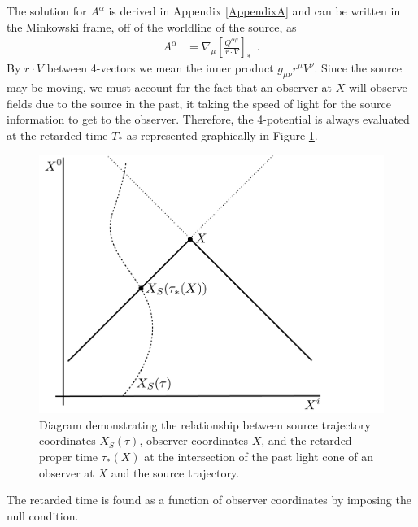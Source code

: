 The solution for $A^{\alpha}$ is derived in Appendix \ref{AppendixA} and can be written in the Minkowski frame, off of the worldline of the source, as
\begin{align}
 A^{\alpha} &=  
\nabla_{\mu}  \left[   \frac{Q^{\alpha \mu} }{
    r \cdot  V  }    \right]_{*}   \ \ .
\label{DipoleSoln1}
\end{align} 
By $r\cdot V $ between 4-vectors we mean the inner product
$g_{\mu\nu}r^\mu V^\nu$.
Since the source may be moving, we must account for the fact that an
observer at $X$ will observe fields due to the source in the past, it
taking the speed of light for the source information to get to the
observer. Therefore, 
the 4-potential is always evaluated at
the retarded time $T_*$ as represented graphically in Figure \ref{RetardedDiagram}.
\begin{figure}
\begin{center}
\includegraphics[scale=0.35]{figures/ch6/Retarded_Diagram.pdf} 
\end{center}
\caption{Diagram demonstrating the relationship between source trajectory coordinates
  $X_S(\tau)$, observer coordinates $X$, and the retarded proper
  time $\tau_*(X)$ at the intersection of the past light cone of an
  observer at $X$ and the source trajectory.}
\label{RetardedDiagram}
\end{figure}
The retarded time is found as a function of observer coordinates by
imposing the null condition.
